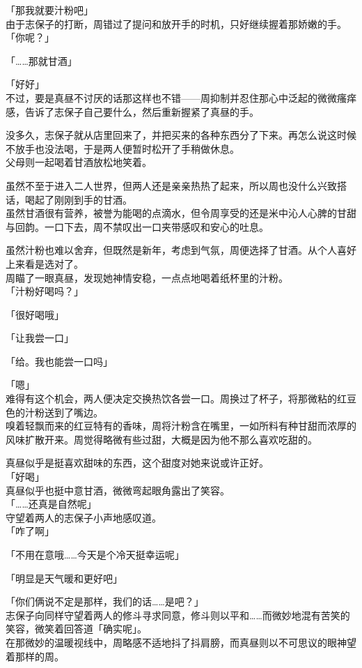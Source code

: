 「那我就要汁粉吧」\\

由于志保子的打断，周错过了提问和放开手的时机，只好继续握着那娇嫩的手。\\

「你呢？」

「……那就甘酒」

「好好」\\

不过，要是真昼不讨厌的话那这样也不错——周抑制并忍住那心中泛起的微微瘙痒感，告诉了志保子自己要什么，然后重新握紧了真昼的手。\\

\vspace{2\baselineskip}

没多久，志保子就从店里回来了，并把买来的各种东西分了下来。再怎么说这时候不放手也没法喝，于是两人便暂时松开了手稍做休息。\\

父母则一起喝着甘酒放松地笑着。

虽然不至于进入二人世界，但两人还是亲亲热热了起来，所以周也没什么兴致搭话，喝起了刚刚到手的甘酒。\\

虽然甘酒很有营养，被誉为能喝的点滴水，但令周享受的还是米中沁人心脾的甘甜与回韵。一口下去，周不禁叹出一口夹带感叹和安心的吐息。

虽然汁粉也难以舍弃，但既然是新年，考虑到气氛，周便选择了甘酒。从个人喜好上来看是选对了。\\

周瞄了一眼真昼，发现她神情安稳，一点点地喝着纸杯里的汁粉。\\

「汁粉好喝吗？」

「很好喝哦」

「让我尝一口」

「给。我也能尝一口吗」

「嗯」\\

难得有这个机会，两人便决定交换热饮各尝一口。周换过了杯子，将那微粘的红豆色的汁粉送到了嘴边。\\

嗅着轻飘而来的红豆特有的香味，周将汁粉含在嘴里，一如所料有种甘甜而浓厚的风味扩散开来。周觉得略微有些过甜，大概是因为他不那么喜欢吃甜的。

真昼似乎是挺喜欢甜味的东西，这个甜度对她来说或许正好。\\

「好喝」\\

真昼似乎也挺中意甘酒，微微弯起眼角露出了笑容。\\

「……还真是自然呢」\\

守望着两人的志保子小声地感叹道。\\

「咋了啊」

「不用在意哦……今天是个冷天挺幸运呢」

「明显是天气暖和更好吧」

「你们俩说不定是那样，我们的话……是吧？」\\

志保子向同样守望着两人的修斗寻求同意，修斗则以平和……而微妙地混有苦笑的笑容，微笑着回答道「确实呢」。\\

在那微妙的温暖视线中，周略感不适地抖了抖肩膀，而真昼则以不可思议的眼神望着那样的周。
